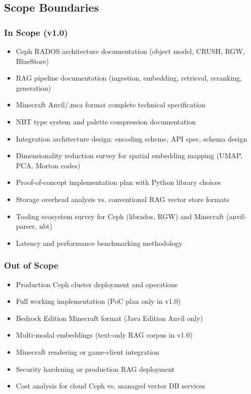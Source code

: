 \documentclass[11pt,letterpaper]{article}
\begin{document}
\subsection{Scope Boundaries}

\subsubsection{In Scope (v1.0)}
\begin{itemize}[leftmargin=1.5em]
  \item Ceph RADOS architecture documentation (object model, CRUSH, RGW, BlueStore)
  \item RAG pipeline documentation (ingestion, embedding, retrieval, reranking, generation)
  \item Minecraft Anvil/.mca format complete technical specification
  \item NBT type system and palette compression documentation
  \item Integration architecture design: encoding scheme, API spec, schema design
  \item Dimensionality reduction survey for spatial embedding mapping (UMAP, PCA, Morton codes)
  \item Proof-of-concept implementation plan with Python library choices
  \item Storage overhead analysis vs. conventional RAG vector store formats
  \item Tooling ecosystem survey for Ceph (librados, RGW) and Minecraft (anvil-parser, nbt)
  \item Latency and performance benchmarking methodology
\end{itemize}

\subsubsection{Out of Scope}
\begin{itemize}[leftmargin=1.5em]
  \item Production Ceph cluster deployment and operations
  \item Full working implementation (PoC plan only in v1.0)
  \item Bedrock Edition Minecraft format (Java Edition Anvil only)
  \item Multi-modal embeddings (text-only RAG corpus in v1.0)
  \item Minecraft rendering or game-client integration
  \item Security hardening or production RAG deployment
  \item Cost analysis for cloud Ceph vs. managed vector DB services
\end{itemize}
\end{document}
